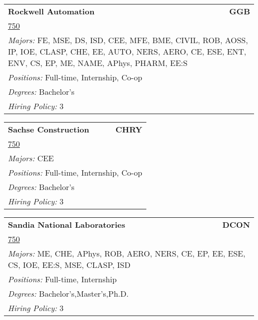 \documentclass[twoside]{article}
\begin{document}
\begin{center}
\begin{multicols}{3}
\begin{FlushLeft}
\begin{minipage}{.9\columnwidth}\begin{tabularx}{.95\columnwidth}{Xr}
                 {\Large\bf Rockwell Automation} & {\Large\bf GGB}\\
    \multicolumn{2}{p{.95\columnwidth}}{\url{750}}\\
    \multicolumn{2}{p{.95\columnwidth}}{\emph{Majors:} FE, MSE, DS, ISD, CEE, MFE, BME, CIVIL, ROB, AOSS, IP, IOE, CLASP, CHE, EE, AUTO, NERS, AERO, CE, ESE, ENT, ENV, CS, EP, ME, NAME, APhys, PHARM, EE:S}\\
    \multicolumn{2}{p{.95\columnwidth}}{\emph{Positions:} Full-time, Internship, Co-op}\\
    \multicolumn{2}{p{.95\columnwidth}}{\emph{Degrees:} Bachelor's}\\
    \multicolumn{2}{p{.95\columnwidth}}{\emph{Hiring Policy:} 3}\\
    \end{tabularx}
    
\end{minipage}
 
\begin{minipage}{.9\columnwidth}\begin{tabularx}{.95\columnwidth}{Xr}
                 {\Large\bf Sachse Construction} & {\Large\bf CHRY}\\
    \multicolumn{2}{p{.95\columnwidth}}{\url{750}}\\
    \multicolumn{2}{p{.95\columnwidth}}{\emph{Majors:} CEE}\\
    \multicolumn{2}{p{.95\columnwidth}}{\emph{Positions:} Full-time, Internship, Co-op}\\
    \multicolumn{2}{p{.95\columnwidth}}{\emph{Degrees:} Bachelor's}\\
    \multicolumn{2}{p{.95\columnwidth}}{\emph{Hiring Policy:} 3}\\
    \end{tabularx}
    
\end{minipage}
 
\begin{minipage}{.9\columnwidth}\begin{tabularx}{.95\columnwidth}{Xr}
                 {\Large\bf Sandia National Laboratories} & {\Large\bf DCON}\\
    \multicolumn{2}{p{.95\columnwidth}}{\url{750}}\\
    \multicolumn{2}{p{.95\columnwidth}}{\emph{Majors:} ME, CHE, APhys, ROB, AERO, NERS, CE, EP, EE, ESE, CS, IOE, EE:S, MSE, CLASP, ISD}\\
    \multicolumn{2}{p{.95\columnwidth}}{\emph{Positions:} Full-time, Internship}\\
    \multicolumn{2}{p{.95\columnwidth}}{\emph{Degrees:} Bachelor's,Master's,Ph.D.}\\
    \multicolumn{2}{p{.95\columnwidth}}{\emph{Hiring Policy:} 3}\\
    \end{tabularx}
    

\end{minipage}
\end{FlushLeft}
\end{multicols}
\end{center}
\end{document}
